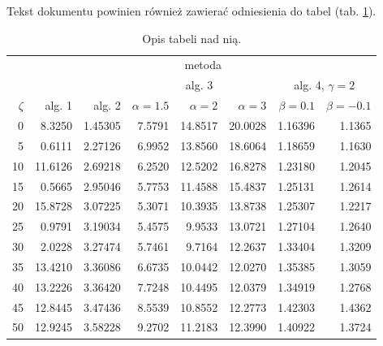 \documentclass[a4paper,twoside,12pt]{book}
\begin{document}
Tekst dokumentu powinien również zawierać odniesienia do tabel (tab. \ref{id:tab:wyniki}).

\begin{table}
\centering
\caption{Opis tabeli nad nią.}
\label{id:tab:wyniki}
\begin{tabular}{rrrrrrrr}
\toprule
	         &                                     \multicolumn{7}{c}{metoda}                                      \\
	         \cmidrule{2-8}
	         &         &         &        \multicolumn{3}{c}{alg. 3}        & \multicolumn{2}{c}{alg. 4, $\gamma = 2$} \\
	         \cmidrule(r){4-6}\cmidrule(r){7-8}
	$\zeta$ &     alg. 1 &   alg. 2 & $\alpha= 1.5$ & $\alpha= 2$ & $\alpha= 3$ &   $\beta = 0.1$  &   $\beta = -0.1$ \\
\midrule
	       0 &  8.3250 & 1.45305 &       7.5791 &    14.8517 &    20.0028 & 1.16396 &                       1.1365 \\
	       5 &  0.6111 & 2.27126 &       6.9952 &    13.8560 &    18.6064 & 1.18659 &                       1.1630 \\
	      10 & 11.6126 & 2.69218 &       6.2520 &    12.5202 &    16.8278 & 1.23180 &                       1.2045 \\
	      15 &  0.5665 & 2.95046 &       5.7753 &    11.4588 &    15.4837 & 1.25131 &                       1.2614 \\
	      20 & 15.8728 & 3.07225 &       5.3071 &    10.3935 &    13.8738 & 1.25307 &                       1.2217 \\
	      25 &  0.9791 & 3.19034 &       5.4575 &     9.9533 &    13.0721 & 1.27104 &                       1.2640 \\
	      30 &  2.0228 & 3.27474 &       5.7461 &     9.7164 &    12.2637 & 1.33404 &                       1.3209 \\
	      35 & 13.4210 & 3.36086 &       6.6735 &    10.0442 &    12.0270 & 1.35385 &                       1.3059 \\
	      40 & 13.2226 & 3.36420 &       7.7248 &    10.4495 &    12.0379 & 1.34919 &                       1.2768 \\
	      45 & 12.8445 & 3.47436 &       8.5539 &    10.8552 &    12.2773 & 1.42303 &                       1.4362 \\
	      50 & 12.9245 & 3.58228 &       9.2702 &    11.2183 &    12.3990 & 1.40922 &                       1.3724 \\
\bottomrule
\end{tabular}
\end{table}  
\end{document}
